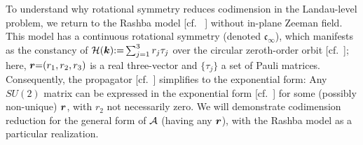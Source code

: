 \documentclass[aps, prb, showpacs, twocolumn, notitlepage, superscriptaddress]{revtex4-1}
\begin{document}

To understand why rotational symmetry reduces codimension in the Landau-level problem, we return to the Rashba model [cf. \ ] without in-plane Zeeman field. This model has a continuous rotational symmetry (denoted $\mathfrak{c}_{\infty}$), which manifests as the constancy of ${\cal H}(\boldsymbol{k}){:}{=}\sum_{j=1}^3r_j\tau_j$ over the circular zeroth-order orbit [cf.\ ]; here, $\boldsymbol{r}{=}(r_1,r_2,r_3)$ is a real three-vector and $\{\tau_j\}$ a set of Pauli matrices.  Consequently, the propagator [cf.\ ]  simplifies to  the exponential form:
Any $SU(2)$ matrix can be expressed in the exponential form [cf.\ ]  for some (possibly non-unique) $\boldsymbol{r}$, with $r_2$ not necessarily zero. We will demonstrate codimension reduction for the general form of ${\cal A}$ (having any $\boldsymbol{r}$), with the Rashba model as a particular realization.




\end{document}
